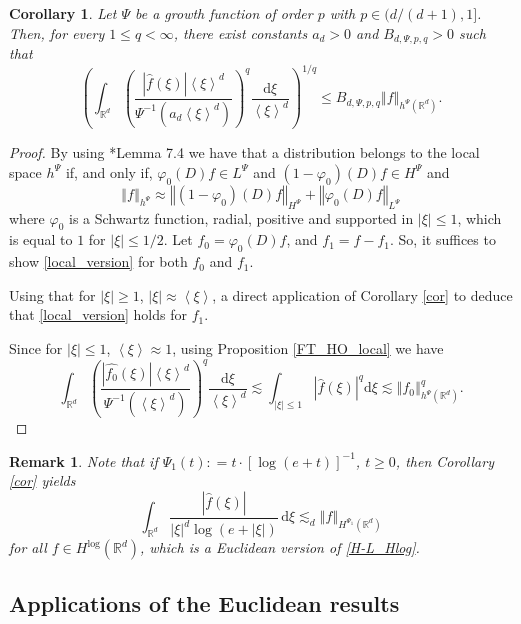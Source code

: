 \documentclass[a4paper, leqno, 10pt]{amsart}
\numberwithin{equation}{section}
\newtheorem{corollary}[thm]{Corollary}
\newtheorem{rmk}[thm]{Remark}
\newcommand{\dd}{\mathrm{d}}
\newcommand{\R}{\mathbb{R}}
\newcommand{\norm}[1]{\left\Vert#1\right\Vert}
\newcommand{\brkt}[1]{\left(#1\right)}
\newcommand{\abs}[1]{\left|#1\right|}
\newcommand{\jap}[1]{\left<#1\right>}
\begin{document}
\begin{corollary}\label{cor_local}
Let $\Psi$ be a growth function of order $p$ with  $p \in ( d/(d+1), 1 ]$. Then, for every $1\leq q<\infty$, there exist constants $a_d >0$ and $B_{d, \Psi,p,q } > 0$ such that   
\begin{equation}\label{local_version}
\brkt{  \int_{\R^d} \brkt{ \frac{\abs{\widehat{f}(\xi)} \jap{\xi}^d }{ \Psi^{-1} \brkt{a_d \jap{\xi}^d }} }^q \frac{\dd \xi}{ \jap{\xi}^d} }^{1/q} \leq  B_{d, \Psi,p,q } \norm{f}_{h^{\Psi} (\R^d)}.    
\end{equation}
\end{corollary}
\begin{proof}
By using \cite{NaSa}*{Lemma 7.4} we have that a distribution belongs to the local space $h^\Psi$ if, and only if, $\varphi_0(D)f\in L^\Psi$ and $(1-\varphi_0)(D)f\in H^\Psi$ and 
\[
\norm{f}_{h^\Psi} \approx \norm{(1-\varphi_0)(D)f}_{H^\Psi}+\norm{\varphi_0(D)f}_{L^\Psi}
\]
where $\varphi_0$ is a Schwartz function, radial, positive and supported in $\abs{\xi}\leq 1$, which is equal to $1$ for $\abs{\xi}\leq 1/2$. Let $f_0=\varphi_0(D)f$, and $f_1=f-f_1$. So, it suffices to show \eqref{local_version} for both $f_0$ and $f_1$.

Using that for $\abs{\xi}\geq 1$, $\abs{\xi}\approx \jap{\xi}$, a direct application of Corollary \ref{cor} to deduce that \eqref{local_version} holds for $f_1$.

Since for $\abs{\xi}\leq 1$, $\jap{\xi}\approx 1$, using Proposition \ref{FT_HO_local} we have 
\[
\int_{\R^d} \brkt{ \frac{\abs{\widehat{f_0}(\xi)} \jap{\xi}^d }{ \Psi^{-1} \brkt{\jap{\xi}^d }} }^q \frac{\dd \xi}{ \jap{\xi}^d}  \lesssim \int_{\abs{\xi}\leq 1} \abs{\widehat{f}(\xi)}^q\dd \xi\lesssim \norm{f_0}_{h^\Psi(\R^d)}^q.
\]
\end{proof}

\begin{rmk}
Note that if $\Psi_1 (t) :  = t \cdot \left[ \log ( e + t ) \right]^{-1}$, $t \geq 0$, then Corollary \ref{cor} yields
\begin{equation}\label{Llog_FT}
\int_{\R^d} \frac{\abs{\widehat{f}(\xi)}}{\abs{\xi}^d \log \brkt{ e + \abs{\xi} } } \, \dd \xi \lesssim_d \norm{f}_{H^{\Psi_1} (\R^d)}
\end{equation}
for all $f\in H^{\log} (\R^d)$, which is a Euclidean version of \eqref{H-L_Hlog}.
	
\end{rmk}
\subsection{Applications of the Euclidean results}\label{applicationsection}
\end{document}
